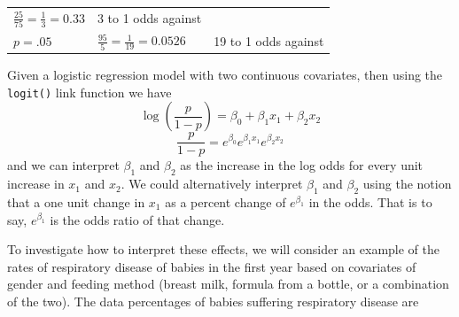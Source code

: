 \documentclass[]{book}
\theoremstyle{definition}
\theoremstyle{definition}
\theoremstyle{remark}
\begin{document}
\begin{longtable}[]{@{}lll@{}}
\begin{minipage}[t]{0.47\columnwidth}
\(\frac{25}{75} = \frac{1}{3} = 0.33\)\strut
\end{minipage} & \begin{minipage}[t]{0.27\columnwidth}\raggedright\strut
3 to 1 odds against\strut
\end{minipage}\tabularnewline
\begin{minipage}[t]{0.18\columnwidth}\raggedright\strut
\(p=.05\)\strut
\end{minipage} & \begin{minipage}[t]{0.47\columnwidth}\raggedright\strut
\(\frac{95}{5} = \frac{1}{19} = 0.0526\)\strut
\end{minipage} & \begin{minipage}[t]{0.27\columnwidth}\raggedright\strut
19 to 1 odds against\strut
\end{minipage}\tabularnewline
\bottomrule
\end{longtable}

Given a logistic regression model with two continuous covariates, then
using the \texttt{logit()} link function we have
\[\log\left(\frac{p}{1-p}\right)   =   \beta_{0}+\beta_{1}x_{1}+\beta_{2}x_{2}\]
\[\frac{p}{1-p} =   e^{\beta_{0}}e^{\beta_{1}x_{1}}e^{\beta_{2}x_{2}}\]
and we can interpret \(\beta_{1}\) and \(\beta_{2}\) as the increase in
the log odds for every unit increase in \(x_{1}\) and \(x_{2}\). We
could alternatively interpret \(\beta_{1}\) and \(\beta_{2}\) using the
notion that a one unit change in \(x_{1}\) as a percent change of
\(e^{\beta_{1}}\) in the odds. That is to say, \(e^{\beta_{1}}\) is the
odds ratio of that change.

To investigate how to interpret these effects, we will consider an
example of the rates of respiratory disease of babies in the first year
based on covariates of gender and feeding method (breast milk, formula
from a bottle, or a combination of the two). The data percentages of
babies suffering respiratory disease are
\end{document}
